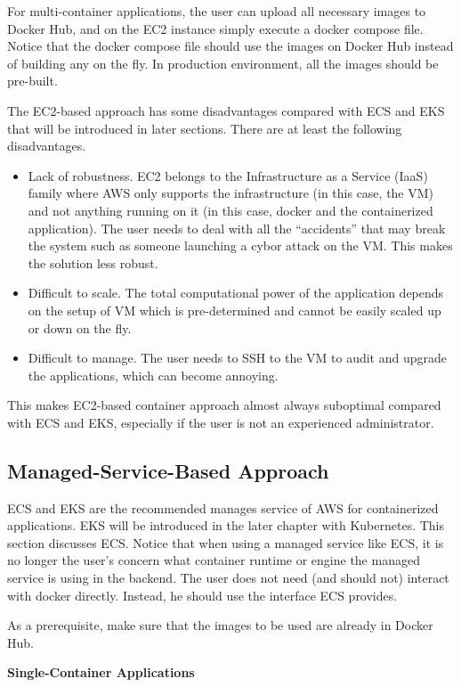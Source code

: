 For multi-container applications, the user can upload all necessary images to Docker Hub, and on the EC2 instance simply execute a docker compose file. Notice that the docker compose file should use the images on Docker Hub instead of building any on the fly. In production environment, all the images should be pre-built.

The EC2-based approach has some disadvantages compared with ECS and EKS that will be introduced in later sections. There are at least the following disadvantages.
\begin{itemize}
  \item Lack of robustness. EC2 belongs to the Infrastructure as a Service (IaaS) family where AWS only supports the infrastructure (in this case, the VM) and not anything running on it (in this case, docker and the containerized application). The user needs to deal with all the ``accidents'' that may break the system such as someone launching a cybor attack on the VM. This makes the solution less robust.
  \item Difficult to scale. The total computational power of the application depends on the setup of VM which is pre-determined and cannot be easily scaled up or down on the fly.
  \item Difficult to manage. The user needs to SSH to the VM to audit and upgrade the applications, which can become annoying.
\end{itemize}
This makes EC2-based container approach almost always suboptimal compared with ECS and EKS, especially if the user is not an experienced administrator.

\subsection{Managed-Service-Based Approach}

ECS and EKS are the recommended manages service of AWS for containerized applications. EKS will be introduced in the later chapter with Kubernetes. This section discusses ECS. Notice that when using a managed service like ECS, it is no longer the user's concern what container runtime or engine the managed service is using in the backend. The user does not need (and should not) interact with docker directly. Instead, he should use the interface ECS provides.

As a prerequisite, make sure that the images to be used are already in Docker Hub. 

\vspace{0.1in}
\noindent \textbf{Single-Container Applications}
\vspace{0.1in}

